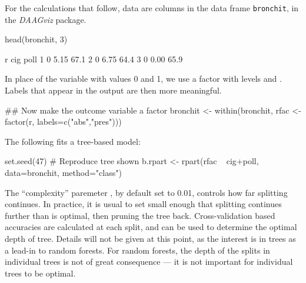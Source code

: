 For the calculations that follow, data are columns in the data frame
\texttt{bronchit}, in the {\em DAAGviz} package.
\begin{Schunk}
\begin{Sinput}
head(bronchit, 3)
\end{Sinput}
\begin{Soutput}
  r  cig poll
1 0 5.15 67.1
2 0 6.75 64.4
3 0 0.00 65.9
\end{Soutput}
\end{Schunk}
In place of the variable  with values 0 and 1, we use a
factor with levels  and . Labels that appear
in the output are then more meaningful.
\begin{Schunk}
\begin{Sinput}
## Now make the outcome variable a factor
bronchit <-
  within(bronchit,
         rfac <- factor(r, labels=c("abs","pres")))
\end{Sinput}
\end{Schunk}

The following fits a tree-based model:
\begin{Schunk}
\begin{Sinput}
set.seed(47)   # Reproduce tree shown
b.rpart <- rpart(rfac ~ cig+poll, data=bronchit,
                 method="class")
\end{Sinput}
\end{Schunk}

The ``complexity'' paremeter , by default set to 0.01,
controls how far splitting continues.  In practice, it is usual to
set  small enough that splitting continues further than
is optimal, then pruning the tree back. Cross-validation based
accuracies are calculated at each split, and can be used to determine
the optimal depth of tree.  Details will not be given at this point,
as the interest is in trees as a lead-in to random forests.  For
random forests, the depth of the splits in individual trees is not
of great consequence --- it is not important for individual trees
to be optimal.

